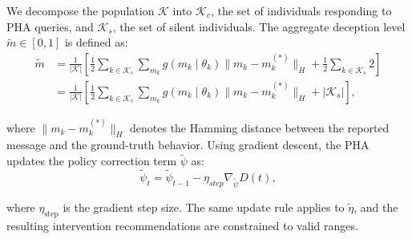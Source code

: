 \documentclass[sigconf,review]{acmart}
\newcommand{\abs}[1]{\left| #1 \right|}
\begin{document}
We decompose the population $\mathcal{K}$ into $\mathcal{K}_c$, the set of individuals responding to PHA queries, and $\mathcal{K}_s$, the set of silent individuals. The aggregate deception level $\tilde m\in[0,1]$ is defined as:
\begin{equation}
\begin{aligned}
    \tilde{m} &= \frac{1}{|\mathcal K|}
\left[\frac{1}{2}\sum\limits_{k\in \mathcal{K}_c}\sum\limits_{m_k} g(m_k\mid \theta_k) \lVert m_k-m_k^{(\ast)} \rVert_H + \frac{1}{2}\sum\limits_{k\in \mathcal{K}_s} 2\right] \\ 
              &= \frac{1}{|\mathcal K|}
\left[\frac{1}{2}\sum\limits_{k\in \mathcal{K}_c}\sum\limits_{m_k} g(m_k\mid \theta_k) \lVert m_k-m_k^{(\ast)} \rVert_H + \abs{\mathcal{K}_s}\right],
\end{aligned}
\end{equation}

where $\lVert m_k - m_k^{(\ast)} \rVert_H$ denotes the Hamming distance between the reported message and the ground-truth behavior.
Using gradient descent, the PHA updates the policy correction term $\tilde{\psi}$ as:
\begin{equation}
\tilde{\psi}_t = \tilde{\psi}_{t-1} - \eta_{step} \nabla_{\tilde{\psi}} D(t),
\end{equation}

where $\eta_{\mathrm{step}}$ is the gradient step size. The same update rule applies to $\widetilde{\eta}$, and the resulting intervention recommendations are constrained to valid ranges.



\end{document}
